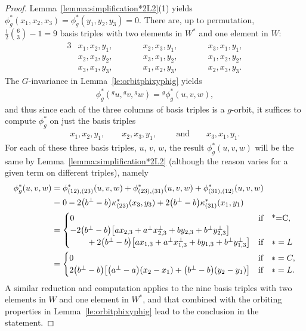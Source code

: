 \documentclass[pdftex]{sigma}
\numberwithin{equation}{section}
\newcommand{\actby}[1]{{}^{#1}}
\begin{document}
\begin{proof}
Lemma~\ref{lemma:simplification*2L2}(1) yields
$\phi_g^{*}(x_1,x_2,x_3)=\phi_g^{*}(y_1,y_2,y_3)=0$.
There are, up to permutation, $\frac{1}{2}\binom{6}{3}-1=9$
basis triples with two elements in $W^*$ and one element in $W$:
\begin{alignat*}{3}
&x_1, x_2, y_1, &\qquad
&x_2, x_3, y_1, &\qquad
&x_3, x_1, y_1, \\
&x_2, x_3, y_2, &\qquad
&x_3, x_1, y_2, &\qquad
&x_1, x_2, y_2, \\
&x_3, x_1, y_3, &\qquad
&x_1, x_2, y_3, &\qquad
&x_2, x_3, y_3.
\end{alignat*}
The $G$-invariance in Lemma~\ref{le:orbitphixyphig} yields
	\begin{gather*}
	\phi^*_g(\actby{g}u,\actby{g}v,\actby{g}w)=\actby{g}\phi^*_g(u,v,w),
	\end{gather*}
and thus since each of the three columns of basis triples is a $g$-orbit,
it suffices to compute $\phi^*_g$ on just the basis triples
	\begin{gather*}
	x_1,x_2,y_1, \qquad x_2,x_3,y_1, \qquad \text{ and} \qquad x_3,x_1,y_1.
	\end{gather*}
For each of these three basis triples, $u$, $v$, $w$, the result $\phi^*_g(u,v,w)$
will be the same by Lemma~\ref{lemma:simplification*2L2} (although the reason
varies for a given term on different triples), namely
\begin{align*}
\phi^*_g(u,v,w)
&=\phi_{(12),(23)}^{*}(u,v,w)
+\phi_{(23),(31)}^{*}(u,v,w)
+\phi_{(31),(12)}^{*}(u,v,w) \\
&=0-2\big(b^\perp-b\big)\kappa^{*}_{(23)}(x_3,y_3)+2\big(b^\perp-b\big)\kappa^{*}_{(31)}(x_1,y_1) \\
&=
\begin{cases}
0 & \text{if}\quad $*=C$, \\
-2\big(b^\perp-b\big)\big[ax_{2,3} + a^\perp x_{2,3}^\perp + by_{2,3} + b^\perp y_{2,3}^\perp\big] \\ \qquad
{}+2\big(b^\perp-b\big)\big[ax_{1,3} + a^\perp x_{1,3}^\perp + by_{1,3} + b^\perp y_{1,3}^\perp\big] &
\text{if}\quad *=L
\end{cases} \\
&=\begin{cases}
0 & \text{if}\quad *=C, \\
2\big(b^\perp-b\big)\big[\big(a^\perp-a\big)(x_2-x_1) + \big(b^\perp-b\big)(y_2-y_1)\big] & \text{if}\quad *=L.
\end{cases}
\end{align*}
A similar reduction and computation applies to the nine basis triples with two elements
in $W$ and one element in $W^*$, and that combined with the orbiting properties in
Lemma~\ref{le:orbitphixyphig} lead to the conclusion in the statement.
\end{proof}
\end{document}
